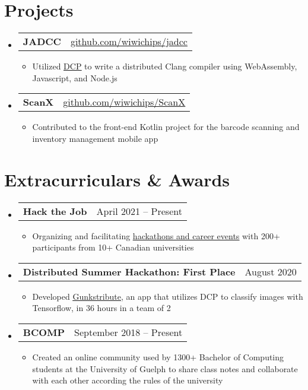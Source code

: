 \documentclass[letterpaper,11pt]{article}
\makeatletter
\newcommand{\resumeItem}[1]{
  \item\small{
    {#1 \vspace{-2pt}}
  }
}
\newcommand{\resumeProjectHeading}[2]{
    \item
    \begin{tabular*}{0.97\textwidth}{l@{\extracolsep{\fill}}r}
      \small#1 & #2 \\
    \end{tabular*}\vspace{-7pt}
}
\newcommand{\resumeSubHeadingListStart}{\begin{itemize}[leftmargin=0.15in, label={}]}
\newcommand{\resumeSubHeadingListEnd}{\end{itemize}}
\newcommand{\resumeItemListStart}{\begin{itemize}}
\newcommand{\resumeItemListEnd}{\end{itemize}\vspace{-5pt}}
\makeatother
\begin{document}
  
\section{Projects}
  \resumeSubHeadingListStart
      \resumeProjectHeading
          {\textbf{JADCC}}{\href{https://github.com/wiwichips/jadcc}{\underline{github.com/wiwichips/jadcc}}}
          \resumeItemListStart
             \resumeItem{Utilized \href{https://dcp.dev/}{\underline{DCP}} to write a distributed Clang compiler using WebAssembly, Javascript, and Node.js }
          \resumeItemListEnd
          
      \resumeProjectHeading
          {\textbf{ScanX}}{\href{https://github.com/wiwichips/ScanX}{\underline{github.com/wiwichips/ScanX}}}
          \resumeItemListStart
            \resumeItem{Contributed to the front-end Kotlin project for the barcode scanning and inventory management mobile app}
          \resumeItemListEnd
  \resumeSubHeadingListEnd



\section{Extracurriculars \& Awards}
  \resumeSubHeadingListStart
      \resumeProjectHeading
          {\textbf{Hack the Job}}{April 2021 -- Present}
          \resumeItemListStart
             \resumeItem{Organizing and facilitating \href{https://hackthejob.ca}{\underline{hackathons and career events}} with 200+ participants from 10+ Canadian universities}
          \resumeItemListEnd
          
      \resumeProjectHeading
          {\textbf{Distributed Summer Hackathon: First Place}}{August 2020}
          \resumeItemListStart
             \resumeItem{Developed \href{https://github.com/wiwichips/gcb}{\underline{Gunkstribute}}, an app that utilizes DCP to classify images with Tensorflow, in 36 hours in a team of 2}
          \resumeItemListEnd
     
     \resumeProjectHeading
          {\textbf{BCOMP}}{September 2018 -- Present}
          \resumeItemListStart
             \resumeItem{Created an online community used by 1300+ Bachelor of Computing students at the University of Guelph to share class notes and collaborate with each other according the rules of the university}
          \resumeItemListEnd
          

  \resumeSubHeadingListEnd
    
    

 

\end{document}
